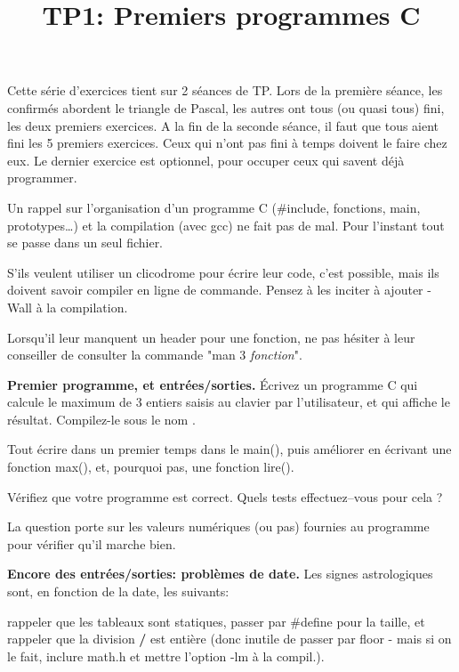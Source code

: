 \documentclass[10pt]{article}\usepackage[enonce]{exemptty}
\begin{document}
\title{TP1: Premiers programmes C}
\maketitle


\begin{Reponse}
  Cette série d'exercices tient sur 2 séances de TP.  Lors de la première
  séance, les confirmés abordent le triangle de Pascal, les autres ont tous (ou
  quasi tous) fini, les deux premiers exercices. A la fin de la seconde séance,
  il faut que tous aient fini les 5 premiers exercices. Ceux qui n'ont pas fini
  à temps doivent le faire chez eux. Le dernier exercice est optionnel, pour
  occuper ceux qui savent déjà programmer.

  Un rappel sur l'organisation d'un programme C (\#include, fonctions, main,
  prototypes\ldots) et la compilation (avec gcc) ne fait pas de mal. Pour
  l'instant tout se passe dans un seul fichier.

  S'ils veulent utiliser un clicodrome pour écrire leur code, c'est possible,
  mais ils doivent savoir compiler en ligne de commande. Pensez à les inciter à
  ajouter -Wall à la compilation.

  Lorsqu'il leur manquent un header pour une fonction, ne pas hésiter à leur
  conseiller de consulter la commande "man 3 \emph{fonction}".
\end{Reponse}
\Exercice \textbf{Premier programme, et entrées/sorties.}
\Question Écrivez un programme C qui calcule le maximum de 3 entiers saisis au
clavier par l'utilisateur, et qui affiche le résultat. Compilez-le sous le nom
. 

\begin{Reponse}
  Tout écrire dans un premier temps dans le main(), puis améliorer en écrivant
  une fonction max(), et, pourquoi pas, une fonction lire().
\end{Reponse}

\Question Vérifiez que votre programme est correct. Quels tests effectuez--vous
pour cela ?

\begin{Reponse}
  La question porte sur les valeurs numériques (ou pas) fournies au programme
  pour vérifier qu'il marche bien.
\end{Reponse}

\Exercice \textbf{Encore des entrées/sorties: problèmes de date.}
Les signes astrologiques sont, en fonction de la date, les suivants: 

\begin{Reponse}
  rappeler que les tableaux sont statiques, passer par \#define pour la taille,
  et rappeler que la division {\bf /} est entière (donc inutile de passer par
  floor - mais si on le fait, inclure math.h et mettre l'option -lm à la
  compil.).
\end{Reponse}
\end{document}
